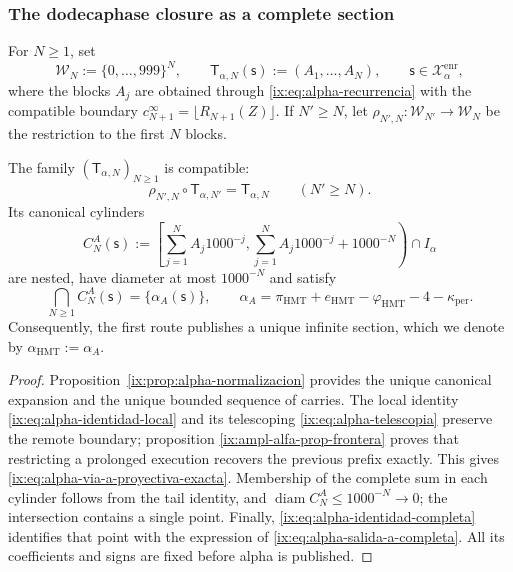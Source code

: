 \subsubsection{The dodecaphase closure as a complete section}

For \(N\geq1\), set
\[
 \mathcal W_N:=\{0,\ldots,999\}^{N},
 \qquad
 \mathsf T_{\alpha,N}(\mathsf s):=(A_1,\ldots,A_N),
 \qquad \mathsf s\in\mathcal X_{\alpha}^{\mathrm{enr}},
\]
where the blocks \(A_j\) are obtained through \eqref{ix:eq:alpha-recurrencia} with the compatible boundary \(c_{N+1}^{\infty}=\lfloor R_{N+1}(Z)\rfloor\). If \(N'\geq N\), let \(\rho_{N',N}:\mathcal W_{N'}\to\mathcal W_N\) be the restriction to the first \(N\) blocks.

\begin{theorem}
\label{ix:thm:alpha-salida-dodecafasica-completa}
The family \((\mathsf T_{\alpha,N})_{N\geq1}\) is compatible:
\begin{equation}
 \rho_{N',N}\circ\mathsf T_{\alpha,N'}
 =\mathsf T_{\alpha,N}
 \qquad(N'\geq N).
 \label{ix:eq:alpha-via-a-proyectiva-exacta}
\end{equation}
Its canonical cylinders
\begin{equation}
 C_N^A(\mathsf s):=
 \left[
  \sum_{j=1}^{N}A_j1000^{-j},
  \sum_{j=1}^{N}A_j1000^{-j}+1000^{-N}
 \right)\cap I_\alpha
 \label{ix:eq:alpha-cilindros-via-a-exactos}
\end{equation}
are nested, have diameter at most \(1000^{-N}\) and satisfy
\begin{equation}
 \bigcap_{N\geq1}C_N^A(\mathsf s)
 =\{\alpha_A(\mathsf s)\},
 \qquad
 \alpha_A
 =\pi_{\mathrm{HMT}}+e_{\mathrm{HMT}}-\varphi_{\mathrm{HMT}}
  -4-\kappa_{\mathrm{per}}.
 \label{ix:eq:alpha-salida-a-completa}
\end{equation}
Consequently, the first route publishes a unique infinite section, which
we denote by \(\alpha_{\mathrm{HMT}}:=\alpha_A\).
\end{theorem}

\begin{proof}
Proposition~\ref{ix:prop:alpha-normalizacion} provides the unique canonical
expansion and the unique bounded sequence of carries. The local identity
\eqref{ix:eq:alpha-identidad-local} and its telescoping
\eqref{ix:eq:alpha-telescopia} preserve the remote boundary; proposition
\ref{ix:ampl-alfa-prop-frontera} proves that restricting a prolonged execution
recovers the previous prefix exactly. This gives
\eqref{ix:eq:alpha-via-a-proyectiva-exacta}. Membership of the complete sum
in each cylinder follows from the tail identity, and
\(\operatorname{diam}C_N^A\leq1000^{-N}\to0\); the intersection contains a
single point. Finally, \eqref{ix:eq:alpha-identidad-completa} identifies that
point with the expression of \eqref{ix:eq:alpha-salida-a-completa}. All its
coefficients and signs are fixed before alpha is published.
\end{proof}

